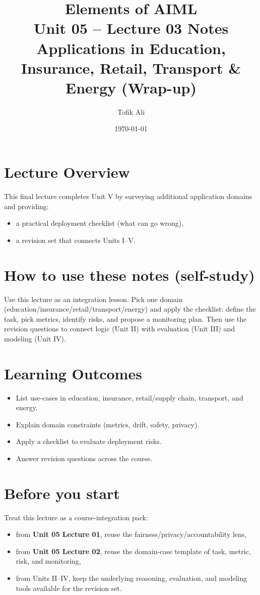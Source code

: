 \documentclass[11pt]{article}
\title{Elements of AIML\\Unit 05 -- Lecture 03 Notes\\Applications in Education, Insurance, Retail, Transport \& Energy (Wrap-up)}
\author{Tofik Ali}
\date{\today}
\begin{document}
\maketitle
\tableofcontents

\section{Lecture Overview}
This final lecture completes Unit V by surveying additional application domains and providing:
\begin{itemize}[leftmargin=*]
  \item a practical deployment checklist (what can go wrong),
  \item a revision set that connects Units I--V.
\end{itemize}
\notesources{\AIMLUnitVSources}

\section{How to use these notes (self-study)}
Use this lecture as an integration lesson.
Pick one domain (education/insurance/retail/transport/energy) and apply the checklist: define the task, pick metrics, identify risks, and propose a monitoring plan.
Then use the revision questions to connect logic (Unit II) with evaluation (Unit III) and modeling (Unit IV).

\section{Learning Outcomes}
\begin{itemize}[leftmargin=*]
  \item List use-cases in education, insurance, retail/supply chain, transport, and energy.
  \item Explain domain constraints (metrics, drift, safety, privacy).
  \item Apply a checklist to evaluate deployment risks.
  \item Answer revision questions across the course.
\end{itemize}

\section{Before you start}
Treat this lecture as a course-integration pack:
\begin{itemize}[leftmargin=*]
  \item from \textbf{Unit 05 Lecture 01}, reuse the fairness/privacy/accountability lens,
  \item from \textbf{Unit 05 Lecture 02}, reuse the domain-case template of task, metric, risk, and monitoring,
  \item from Units II--IV, keep the underlying reasoning, evaluation, and modeling tools available for the revision set.
\end{itemize}
\end{document}
